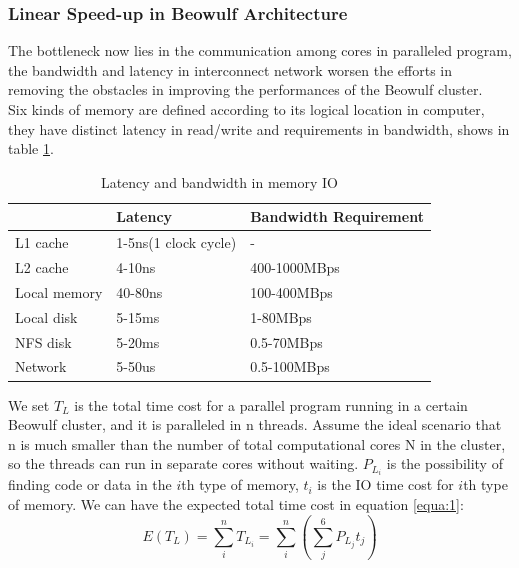 \documentclass[11pt,openright,a4paper]{report}
\begin{document}
\subsubsection{Linear Speed-up in Beowulf Architecture}
The bottleneck now lies in the communication among cores in paralleled program\cite{brown2004engineering}, the bandwidth and latency in interconnect network worsen the efforts in removing the obstacles in improving the performances of the Beowulf cluster.\\
Six kinds of memory are defined according to its logical location in computer, they have distinct latency in read/write and requirements in bandwidth, shows in table \ref{table:1}.\\
\begin{table}[htb]
\begin{center}
	\caption{Latency and bandwidth in memory IO}\cite{johnson2005memory}
	\label{table:1}
	\begin{tabular}{lll}
		\hline
		& Latency              & Bandwidth Requirement \\ \hline
		L1 cache     & 1-5ns(1 clock cycle) & -                     \\
		L2 cache     & 4-10ns               & 400-1000MBps          \\
		Local memory & 40-80ns              & 100-400MBps           \\
		Local disk   & 5-15ms               & 1-80MBps              \\
		NFS disk     & 5-20ms               & 0.5-70MBps            \\
		Network      & 5-50us               & 0.5-100MBps           \\ \hline
	\end{tabular}
\end{center}
\end{table}
We set  $T_{L}$ is the total time cost for a parallel program running in a certain Beowulf cluster, and it is paralleled in n threads. Assume the ideal scenario that n is much smaller than the number of total computational cores N in the cluster, so the threads can run in separate cores without waiting. $P_{L_{i}}$ is the possibility of finding code or data in the ${i}$th type of memory, $t_{i}$ is the IO time cost for ${i}$th type of memory. We can have the expected total time cost in equation \ref{equa:1}:\\
\begin{equation}
\label{equa:1}
E(T_{L})=\sum_{i}^{n}T_{L_{i}}=\sum_{i}^{n}(\sum_{j}^{6}P_{L_{j}}t_{j})
\end{equation}
\end{document}
